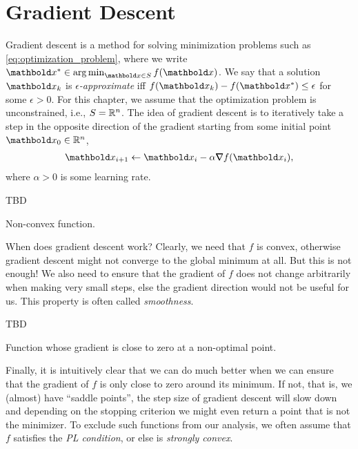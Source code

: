 
\chapter{Gradient Descent}

Gradient descent is a method for solving minimization problems such as \cref{eq:optimization_problem}, where we write $\s{\vx} \in \argmin_{\vx \in \sS} f(\vx)$. We say that a solution $\vx_k$ is \emph{$\epsilon$-approximate} iff $f(\vx_k) - f(\s{\vx}) \leq \epsilon$ for some $\epsilon > 0$. For this chapter, we assume that the optimization problem is unconstrained, i.e., $S = \mathbb{R}^n$. The idea of gradient descent is to iteratively take a step in the opposite direction of the gradient starting from some initial point $\vx_0 \in \R^n$, \begin{align}
    \vx_{i+1} \gets \vx_i - \alpha \grad f(\vx_i),
\end{align} where $\alpha > 0$ is some learning rate.
\begin{marginfigure}
TBD
\caption{Non-convex function.}
\end{marginfigure}

When does gradient descent work? Clearly, we need that $f$ is convex, otherwise gradient descent might not converge to the global minimum at all. But this is not enough! We also need to ensure that the gradient of $f$ does not change arbitrarily when making very small steps, else the gradient direction would not be useful for us. This property is often called \emph{smoothness}.

\begin{marginfigure}
TBD
\caption{Function whose gradient is close to zero at a non-optimal point.}
\end{marginfigure}
Finally, it is intuitively clear that we can do much better when we can ensure that the gradient of $f$ is only close to zero around its minimum. If not, that is, we (almost) have ``saddle points'', the step size of gradient descent will slow down and depending on the stopping criterion we might even return a point that is not the minimizer. To exclude such functions from our analysis, we often assume that $f$ satisfies the \emph{PL condition}, or else is \emph{strongly convex}.

